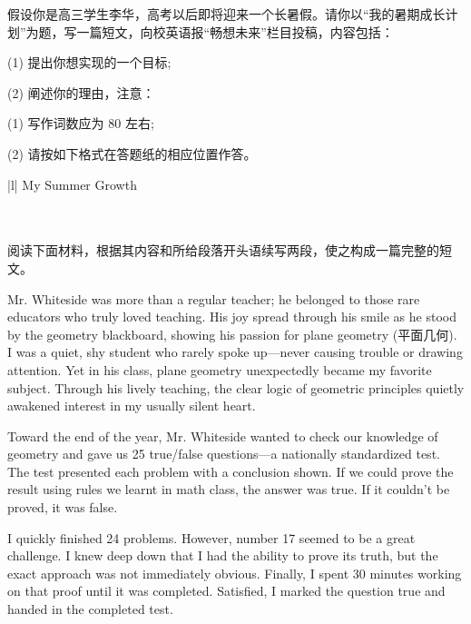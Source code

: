 \documentclass{英语试卷}
\begin{document}
\par 假设你是高三学生李华，高考以后即将迎来一个长暑假。请你以“我的暑期成长计划”为题，写一篇短文，向校英语报“畅想未来”栏目投稿，内容包括：\par
\par (1) 提出你想实现的一个目标;\par
\par (2) 阐述你的理由，注意：\par
\par (1) 写作词数应为 80 左右;\par
\par (2) 请按如下格式在答题纸的相应位置作答。\par
\par\vspace{0.4em}
\begin{center}\begin{tabular}{{|l|}}
\hline
My Summer Growth \\
 \\
 \\
\hline
\end{tabular}\end{center}
\vspace{0.4em}
\par 阅读下面材料，根据其内容和所给段落开头语续写两段，使之构成一篇完整的短文。\par
\par Mr. Whiteside was more than a regular teacher; he belonged to those rare educators who truly loved teaching. His joy spread through his smile as he stood by the geometry blackboard, showing his passion for plane geometry (平面几何). I was a quiet, shy student who rarely spoke up—never causing trouble or drawing attention. Yet in his class, plane geometry unexpectedly became my favorite subject. Through his lively teaching, the clear logic of geometric principles quietly awakened interest in my usually silent heart.\par
\par Toward the end of the year, Mr. Whiteside wanted to check our knowledge of geometry and gave us 25 true/false questions—a nationally standardized test. The test presented each problem with a conclusion shown. If we could prove the result using rules we learnt in math class, the answer was true. If it couldn't be proved, it was false.\par
\par I quickly finished 24 problems. However, number 17 seemed to be a great challenge. I knew deep down that I had the ability to prove its truth, but the exact approach was not immediately obvious. Finally, I spent 30 minutes working on that proof until it was completed. Satisfied, I marked the question true and handed in the completed test.\par
\end{document}
